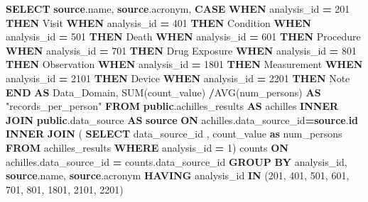 \documentclass[
]{book}
\newenvironment{Shaded}{\begin{snugshade}}{\end{snugshade}}
\newcommand{\ControlFlowTok}[1]{\textcolor[rgb]{0.13,0.29,0.53}{\textbf{#1}}}
\newcommand{\DecValTok}[1]{\textcolor[rgb]{0.00,0.00,0.81}{#1}}
\newcommand{\FunctionTok}[1]{\textcolor[rgb]{0.00,0.00,0.00}{#1}}
\newcommand{\KeywordTok}[1]{\textcolor[rgb]{0.13,0.29,0.53}{\textbf{#1}}}
\newcommand{\NormalTok}[1]{#1}
\newcommand{\OperatorTok}[1]{\textcolor[rgb]{0.81,0.36,0.00}{\textbf{#1}}}
\newcommand{\OtherTok}[1]{\textcolor[rgb]{0.56,0.35,0.01}{#1}}
\newcommand{\StringTok}[1]{\textcolor[rgb]{0.31,0.60,0.02}{#1}}
\begin{document}
\begin{Shaded}
\begin{Highlighting}[]
\KeywordTok{SELECT} 
    \KeywordTok{source}\NormalTok{.name,}
    \KeywordTok{source}\NormalTok{.acronym,}
    \ControlFlowTok{CASE} 
    \ControlFlowTok{WHEN}\NormalTok{ analysis\_id }\OperatorTok{=} \DecValTok{201} \ControlFlowTok{THEN} \StringTok{\textquotesingle{}Visit\textquotesingle{}}
    \ControlFlowTok{WHEN}\NormalTok{ analysis\_id }\OperatorTok{=} \DecValTok{401} \ControlFlowTok{THEN} \StringTok{\textquotesingle{}Condition\textquotesingle{}}
    \ControlFlowTok{WHEN}\NormalTok{ analysis\_id }\OperatorTok{=} \DecValTok{501} \ControlFlowTok{THEN} \StringTok{\textquotesingle{}Death\textquotesingle{}}
    \ControlFlowTok{WHEN}\NormalTok{ analysis\_id }\OperatorTok{=} \DecValTok{601} \ControlFlowTok{THEN} \StringTok{\textquotesingle{}Procedure\textquotesingle{}}
    \ControlFlowTok{WHEN}\NormalTok{ analysis\_id }\OperatorTok{=} \DecValTok{701} \ControlFlowTok{THEN} \StringTok{\textquotesingle{}Drug Exposure\textquotesingle{}}
    \ControlFlowTok{WHEN}\NormalTok{ analysis\_id }\OperatorTok{=} \DecValTok{801} \ControlFlowTok{THEN} \StringTok{\textquotesingle{}Observation\textquotesingle{}}
    \ControlFlowTok{WHEN}\NormalTok{ analysis\_id }\OperatorTok{=} \DecValTok{1801} \ControlFlowTok{THEN} \StringTok{\textquotesingle{}Measurement\textquotesingle{}}
    \ControlFlowTok{WHEN}\NormalTok{ analysis\_id }\OperatorTok{=} \DecValTok{2101} \ControlFlowTok{THEN} \StringTok{\textquotesingle{}Device\textquotesingle{}}
    \ControlFlowTok{WHEN}\NormalTok{ analysis\_id }\OperatorTok{=} \DecValTok{2201} \ControlFlowTok{THEN} \StringTok{\textquotesingle{}Note\textquotesingle{}}
    \ControlFlowTok{END} \KeywordTok{AS}\NormalTok{ Data\_Domain,}
    \FunctionTok{SUM}\NormalTok{(count\_value) }\OperatorTok{/}\FunctionTok{AVG}\NormalTok{(num\_persons) }\KeywordTok{AS} \OtherTok{"records\_per\_person"}
\KeywordTok{FROM} \KeywordTok{public}\NormalTok{.achilles\_results }\KeywordTok{AS}\NormalTok{ achilles}
\KeywordTok{INNER} \KeywordTok{JOIN} \KeywordTok{public}\NormalTok{.data\_source }\KeywordTok{AS} \KeywordTok{source} \KeywordTok{ON}\NormalTok{ achilles.data\_source\_id}\OperatorTok{=}\KeywordTok{source}\NormalTok{.}\KeywordTok{id}
\KeywordTok{INNER} \KeywordTok{JOIN}\NormalTok{ (}
  \KeywordTok{SELECT}\NormalTok{ data\_source\_id , count\_value }\KeywordTok{as}\NormalTok{ num\_persons}
  \KeywordTok{FROM}\NormalTok{ achilles\_results}
  \KeywordTok{WHERE}\NormalTok{ analysis\_id }\OperatorTok{=} \DecValTok{1}\NormalTok{) counts }\KeywordTok{ON}\NormalTok{ achilles.data\_source\_id }\OperatorTok{=}\NormalTok{ counts.data\_source\_id }
\KeywordTok{GROUP} \KeywordTok{BY}\NormalTok{ analysis\_id, }\KeywordTok{source}\NormalTok{.name, }\KeywordTok{source}\NormalTok{.acronym}
\KeywordTok{HAVING}\NormalTok{ analysis\_id }\KeywordTok{IN}\NormalTok{ (}\DecValTok{201}\NormalTok{, }\DecValTok{401}\NormalTok{, }\DecValTok{501}\NormalTok{, }\DecValTok{601}\NormalTok{, }\DecValTok{701}\NormalTok{, }\DecValTok{801}\NormalTok{, }\DecValTok{1801}\NormalTok{, }\DecValTok{2101}\NormalTok{, }\DecValTok{2201}\NormalTok{)}
\end{Highlighting}
\end{Shaded}
\end{document}
